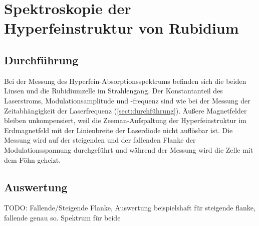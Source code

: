 \section{Spektroskopie der Hyperfeinstruktur von Rubidium}
\subsection{Durchführung}
Bei der Messung des Hyperfein-Absorptionsspektrums befinden sich die beiden Linsen und
die Rubidiumzelle im Strahlengang.
Der Konstantanteil des Laserstroms, Modulationsamplitude und -frequenz
sind wie bei der Messung der Zeitabhängigkeit der Laserfrequenz (\autoref{sect:durchführung}).
Äußere Magnetfelder bleiben unkompensiert, weil die Zeeman-Aufspaltung der Hyperfeinstruktur im Erdmagnetfeld
mit der Linienbreite der Laserdiode nicht auflösbar ist.
Die Messung wird auf der steigenden und der fallenden Flanke der Modulationsspannung durchgeführt und
während der Messung wird die Zelle mit dem Föhn geheizt.


\subsection{Auswertung}
TODO: Fallende/Steigende Flanke, Auswertung beispielshaft für steigende flanke, fallende genau so. Spektrum für beide
